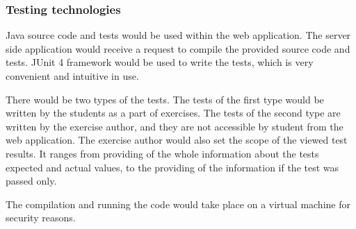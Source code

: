 \subsubsection{Testing technologies}

Java source code and tests would be used within the web application. The server side application would receive a request to compile the provided source code and tests. JUnit 4 framework would be used to write the tests, which is very convenient and intuitive in use. 

There would be two types of the tests. The tests of the first type would be written by the students as a part of exercises. The tests of the second type are written by the exercise author, and they are not accessible by student from the web application. The exercise author would also set the scope of the viewed test results. It ranges from providing of the whole information about the tests expected and actual values, to the providing of the information if the test was passed only.

The compilation and running the code would take place on a virtual machine for security reasons.